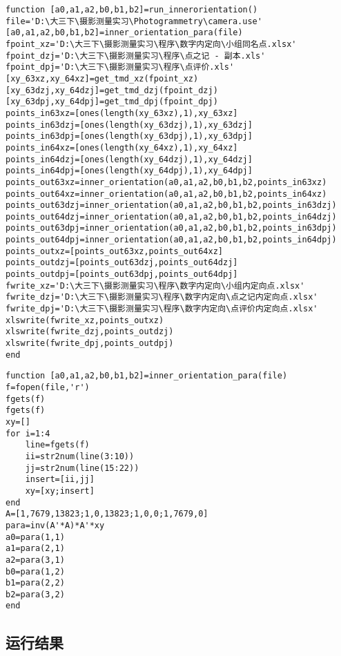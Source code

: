 \begin{lstlisting}[caption=run\_innerorientation.m]
function [a0,a1,a2,b0,b1,b2]=run_innerorientation()
file='D:\大三下\摄影测量实习\Photogrammetry\camera.use'
[a0,a1,a2,b0,b1,b2]=inner_orientation_para(file)
fpoint_xz='D:\大三下\摄影测量实习\程序\数字内定向\小组同名点.xlsx'
fpoint_dzj='D:\大三下\摄影测量实习\程序\点之记 - 副本.xls'
fpoint_dpj='D:\大三下\摄影测量实习\程序\点评价.xls'
[xy_63xz,xy_64xz]=get_tmd_xz(fpoint_xz)
[xy_63dzj,xy_64dzj]=get_tmd_dzj(fpoint_dzj)
[xy_63dpj,xy_64dpj]=get_tmd_dpj(fpoint_dpj)
points_in63xz=[ones(length(xy_63xz),1),xy_63xz]
points_in63dzj=[ones(length(xy_63dzj),1),xy_63dzj]
points_in63dpj=[ones(length(xy_63dpj),1),xy_63dpj]
points_in64xz=[ones(length(xy_64xz),1),xy_64xz]
points_in64dzj=[ones(length(xy_64dzj),1),xy_64dzj]
points_in64dpj=[ones(length(xy_64dpj),1),xy_64dpj]
points_out63xz=inner_orientation(a0,a1,a2,b0,b1,b2,points_in63xz)
points_out64xz=inner_orientation(a0,a1,a2,b0,b1,b2,points_in64xz)
points_out63dzj=inner_orientation(a0,a1,a2,b0,b1,b2,points_in63dzj)
points_out64dzj=inner_orientation(a0,a1,a2,b0,b1,b2,points_in64dzj)
points_out63dpj=inner_orientation(a0,a1,a2,b0,b1,b2,points_in63dpj)
points_out64dpj=inner_orientation(a0,a1,a2,b0,b1,b2,points_in64dpj)
points_outxz=[points_out63xz,points_out64xz]
points_outdzj=[points_out63dzj,points_out64dzj]
points_outdpj=[points_out63dpj,points_out64dpj]
fwrite_xz='D:\大三下\摄影测量实习\程序\数字内定向\小组内定向点.xlsx'
fwrite_dzj='D:\大三下\摄影测量实习\程序\数字内定向\点之记内定向点.xlsx'
fwrite_dpj='D:\大三下\摄影测量实习\程序\数字内定向\点评价内定向点.xlsx'
xlswrite(fwrite_xz,points_outxz)
xlswrite(fwrite_dzj,points_outdzj)
xlswrite(fwrite_dpj,points_outdpj)
end
\end{lstlisting}

\begin{lstlisting}[caption=inner\_orientation\_para.m]
function [a0,a1,a2,b0,b1,b2]=inner_orientation_para(file)
f=fopen(file,'r')
fgets(f)
fgets(f)
xy=[]
for i=1:4
    line=fgets(f)
    ii=str2num(line(3:10))
    jj=str2num(line(15:22))
    insert=[ii,jj]
    xy=[xy;insert]
end
A=[1,7679,13823;1,0,13823;1,0,0;1,7679,0]
para=inv(A'*A)*A'*xy
a0=para(1,1)
a1=para(2,1)
a2=para(3,1)
b0=para(1,2)
b1=para(2,2)
b2=para(3,2)
end   
\end{lstlisting}

\subsection{运行结果}

